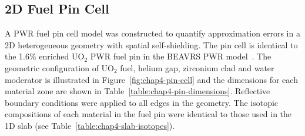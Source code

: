 \subsection{2D Fuel Pin Cell}
\label{subsec:chap4-pin}

A \ac{PWR} fuel pin cell model was constructed to quantify approximation errors in a 2D heterogeneous geometry with spatial self-shielding. The pin cell is identical to the 1.6\% enriched UO$_2$ \ac{PWR} fuel pin in the \ac{BEAVRS} \ac{PWR} model~\cite{horelik2013beavrs}. The geometric configuration of UO$_2$ fuel, helium gap, zirconium clad and water moderator is illustrated in Figure~\ref{fig:chap4-pin-cell} and the dimensions for each material zone are shown in Table~\ref{table:chap4-pin-dimensions}. Reflective boundary conditions were applied to all edges in the geometry. The isotopic compositions of each material in the fuel pin were identical to those used in the 1D slab (see Table~\ref{table:chap4-slab-isotopes}). 

